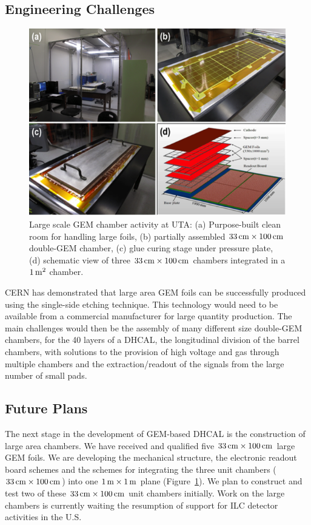 \subsection{Engineering Challenges}
\begin{figure}
	\centering
	\includegraphics[width=.5\textwidth]{Calorimeter/GEM_HCAL/activitySummary}
	\caption{Large scale GEM chamber activity at UTA: (a) Purpose-built clean room for handling large foils,
(b) partially assembled $\unit[33]{cm} \times \unit[100]{cm}$ double-GEM chamber, (c) glue curing stage under pressure plate,
(d) schematic view of three $\unit[33]{cm} \times \unit[100]{cm}$ chambers integrated in a $\unit[1]{m^2}$ chamber.}
	\label{fig:Calorimeter:GEM:activitySummary}
\end{figure}
CERN has demonstrated that large area GEM foils can be successfully produced using the single-side etching technique. This technology would need to be available from a commercial manufacturer for large quantity production. The main challenges would then be the assembly of many different size double-GEM chambers, for the 40 layers of a DHCAL, the longitudinal division of the barrel chambers, with solutions to the provision of high voltage and gas through multiple chambers and the extraction/readout of the signals from the large number of small pads.
\subsection{Future Plans}
The next stage in the development of GEM-based DHCAL is the construction of large area chambers. We have received and qualified five $\unit[33]{cm}\times\unit[100]{cm}$ large GEM foils. We are developing the mechanical structure, the electronic readout board schemes and the schemes for integrating the three unit chambers ($\unit[33]{cm}\times\unit[100]{cm}$) into one $\unit[1]{m}\times\unit[1]{m}$ plane (Figure~\ref{fig:Calorimeter:GEM:activitySummary}). We plan to construct and test two of these $\unit[33]{cm}\times\unit[100]{cm}$ unit chambers initially.
Work on the large chambers is currently waiting the resumption of support for ILC detector activities in the U.S.
